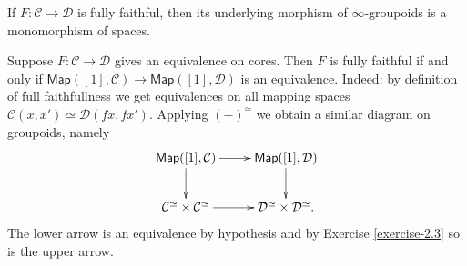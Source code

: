 \begin{lemma}
\label{lemma-full-faithful-implies-underlying-groupoid-map-is-monomorphism}
If $F: \mathcal{C} \to \mathcal{D}$ is fully faithful,
then its underlying morphism of $\infty$-groupoids is a monomorphism
of spaces.
\end{lemma}

\begin{remark}
\label{remark-equivalence-on-cores-implies-fully-faithful-iff}
Suppose $F:\mathcal{C} \to \mathcal{D}$ gives an equivalence
on cores. Then $F$ is fully faithful
if and only if $\mathsf{Map}([1],\mathcal{C}) \to \mathsf{Map}([1],\mathcal{D})$ 
is an equivalence. Indeed: by definition of full faithfullness
we get equivalences on all mapping spaces 
$\mathcal{C}(x,x') \simeq \mathcal{D}(fx,fx')$.
Applying $(-)^\simeq$ we obtain a similar diagram on groupoids,
namely
$$
\xymatrix{
\mathsf{Map}([1],\mathcal{C})\ar[r]\ar[d]&
\mathsf{Map}([1],\mathcal{D})\ar[d]\\
\mathcal{C}^\simeq \times \mathcal{C}^\simeq\ar[r]&
\mathcal{D}^\simeq\times \mathcal{D}^\simeq.
}
$$
The lower arrow is an equivalence by hypothesis
and by Exercise \ref{exercise-2.3} so is the upper arrow.
\end{remark}







